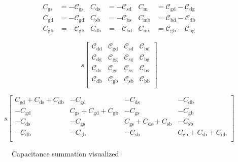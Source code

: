 \documentclass{article}[11pt]
\begin{document}
\begin{align}\label{eq:bsim3v3-caps}
C_{\mathrm{gs}} &= - \mathcal{C}_{{\scriptscriptstyle \mathrm{gs}}}  &  C_{\mathrm{ds}} &= - \mathcal{C}_{{\scriptscriptstyle \mathrm{sd}}}  &  C_{\mathrm{m}}  &=  \mathcal{C}_{{\scriptscriptstyle \mathrm{gd}}} - \mathcal{C}_{{\scriptscriptstyle \mathrm{dg}}} \nonumber\\
C_{\mathrm{gd}} &= - \mathcal{C}_{{\scriptscriptstyle \mathrm{gd}}}  &  C_{\mathrm{sb}} &= - \mathcal{C}_{{\scriptscriptstyle \mathrm{bs}}}  &  C_{\mathrm{mb}} &=  \mathcal{C}_{{\scriptscriptstyle \mathrm{bd}}} - \mathcal{C}_{{\scriptscriptstyle \mathrm{db}}} \\
C_{\mathrm{gb}} &= - \mathcal{C}_{{\scriptscriptstyle \mathrm{gb}}}  &  C_{\mathrm{db}} &= - \mathcal{C}_{{\scriptscriptstyle \mathrm{bd}}}  &  C_{\mathrm{mx}} &=  \mathcal{C}_{{\scriptscriptstyle \mathrm{gb}}} - \mathcal{C}_{{\scriptscriptstyle \mathrm{bg}}} \nonumber
\end{align}


\begin{equation}
s
\begin{bmatrix}
\mathcal{C}_{\mathrm{dd}} & \mathcal{C}_{\mathrm{gd}} & \mathcal{C}_{\mathrm{sd}} & \mathcal{C}_{\mathrm{bd}} \\
\mathcal{C}_{\mathrm{dg}} & \mathcal{C}_{\mathrm{gg}} & \mathcal{C}_{\mathrm{sg}} & \mathcal{C}_{\mathrm{bg}} \\
\mathcal{C}_{\mathrm{ds}} & \mathcal{C}_{\mathrm{gs}} & \mathcal{C}_{\mathrm{ss}} & \mathcal{C}_{\mathrm{bs}} \\
\mathcal{C}_{\mathrm{db}} & \mathcal{C}_{\mathrm{gb}} & \mathcal{C}_{\mathrm{sb}} & \mathcal{C}_{\mathrm{bb}} \\
\end{bmatrix}
\end{equation}

\begin{equation}
s
\begin{bmatrix}
C_{\mathrm{gd}}+C_{\mathrm{ds}}+C_{\mathrm{db}}    &  -C_{\mathrm{gd}}                                & -C_{\mathrm{ds}}                                  & -C_{\mathrm{db}}                                \\
-C_{\mathrm{gd}}                                   &  C_{\mathrm{gs}}+C_{\mathrm{gd}}+C_{\mathrm{gb}} & -C_{\mathrm{gs}}                                  & -C_{\mathrm{gb}}                                \\
-C_{\mathrm{ds}}                                   &  -C_{\mathrm{gs}}                                & C_{\mathrm{gs}}+C_{\mathrm{ds}}+C_{\mathrm{sb}}   & -C_{\mathrm{sb}}                                \\
-C_{\mathrm{db}}                                   &  -C_{\mathrm{gb}}                                & -C_{\mathrm{sb}}                                  & C_{\mathrm{gb}}+C_{\mathrm{sb}}+C_{\mathrm{db}} \\
\end{bmatrix}
\end{equation}

\begin{figure}[H]
  \centering
  \begin{tikzpicture}[scale=0.9]
    
  \end{tikzpicture}
  \caption{Capacitance summation visualized}
  \label{fig:x1}
\end{figure}

\printbibliography
\end{document}
